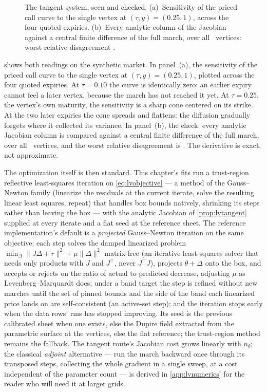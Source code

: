 \begin{figure}[htbp]
\centering
{}
\caption{The tangent system, seen and checked.  (a)~Sensitivity of the
priced call curve to the single vertex at $(\tau,y)=(0.25,1)$, across
the four quoted expiries.  (b)~Every analytic column of the Jacobian
against a central finite difference of the full march, over all
\MacLvInflVtx\ vertices: worst relative disagreement
\MacLvInflMaxRel.}
\label{fig:lvinfluence}
\end{figure}

 shows both readings on the synthetic market.
In panel~(a), the sensitivity of the priced call curve to the single
vertex at $(\tau,y)=(0.25,1)$, plotted across the four quoted
expiries.  At $\tau=0.10$ the curve is identically zero: an earlier
expiry cannot feel a later vertex, because the march has not reached
it yet.  At $\tau=0.25$, the vertex's own maturity, the sensitivity is
a sharp cone centered on its strike.  At the two later expiries the
cone spreads and flattens: the diffusion gradually forgets where it
collected its variance.  In panel~(b), the check: every analytic
Jacobian column is compared against a central finite difference of the
full march, over all \MacLvInflVtx\ vertices, and the worst relative
disagreement is \MacLvInflMaxRel.  The derivative is exact, not
approximate.

The optimization itself is then standard.  This chapter's fits run a
trust-region reflective least-squares iteration on
\eqref{eq:lvobjective} --- a method of the Gauss--Newton family
(linearize the residuals at the current iterate, solve the resulting
linear least squares, repeat) that handles
box bounds natively, shrinking its steps rather than leaving the box
\citep{BranchColemanLi1999} --- with the analytic Jacobian of
\cref{prop:lvtangent} supplied at every iterate and a flat seed at the
reference sheet.  The reference implementation's default is a
\emph{projected} Gauss--Newton iteration on the same objective: each
step solves the damped linearized problem
$\min_\Delta\|J\Delta+r\|^{2}+\mu\|\Delta\|^{2}$ matrix-free (an
iterative least-squares solver that needs only products with $J$ and
$J^{\top}$, never $J^{\top}J$), projects $\theta+\Delta$ onto the box,
and accepts or rejects on the ratio of actual to predicted decrease,
adjusting $\mu$ as Levenberg--Marquardt does; under a band target the
step is refined without new marches until the set of pinned bounds
and the side of the band each linearized price lands on are
self-consistent (an active-set step); and the iteration stops early
when the data rows' rms has stopped improving.  Its seed is the
previous calibrated sheet when one exists, else the Dupire field
extracted from the parametric surface at the vertices, else the flat
reference; the trust-region method remains the fallback.  The tangent
route's Jacobian cost grows linearly
with $n_\theta$; the classical \emph{adjoint} alternative --- run the
march backward once through its transposed steps, collecting the whole
gradient in a single sweep, at a cost independent of the
parameter count --- is derived in \cref{app:lvnumerics} for the reader
who will need it at larger grids.
